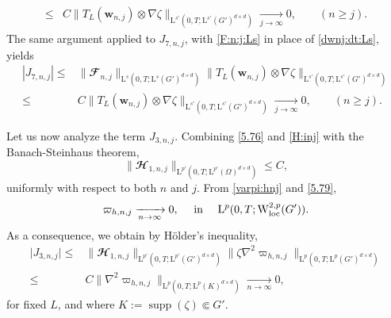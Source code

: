 \documentclass[12pt,reqno]{amsart}
\numberwithin{equation}{section}
\theoremstyle{definition}
\def\1{\Omega}
\def\supp{\operatorname{supp}}
\def\W{\mathrm{W}}
\def\L{\mathrm{L}}
\def\w{\boldsymbol{w}}
\def\bcH{\mathbfcal{H}}
\def\bcF{\mathbfcal{F}}
\begin{document}
{{{\begin{equation}
\begin{split}
\leq &
C\|T_L(\w_{n,j})\otimes\nabla\zeta\|_{\L^{s'}(0,T;\L^{s'}(G')^{d\times d})} \xrightarrow[j\to\infty]{}0,\qquad (n\geq j).
\end{split}
\end{equation}
The same argument applied to $J_{7,n,j}$, with \eqref{F:n:j:Ls} in place of \eqref{dwnj:dt:Ls}, yields
\begin{equation}\label{est:J7:n:j}
\begin{split}
|J_{7,n,j}|\leq & \|\bcF_{n,j}\|_{\L^s(0,T;\L^s(G')^{d\times d})}\|T_L(\w_{n,j})\otimes\nabla\zeta\|_{\L^{s'}(0,T;\L^{s'}(G')^{d\times d})} \\
\leq &
C\|T_L(\w_{n,j})\otimes\nabla\zeta\|_{\L^{s'}(0,T;\L^{s'}(G')^{d\times d})} \xrightarrow[j\to\infty]{}0,\qquad (n\geq j).
\end{split}
\end{equation}

Let us now analyze the term $J_{3,n,j}$.
Combining \eqref{5.76} and \eqref{H:inj} with the Banach-Steinhaus theorem,
\begin{equation*}
\|\bcH_{1,n,j}\|_{\L^{p'}(0,T;\L^{p'}(\1)^{d\times d})} \leq C,
\end{equation*}
uniformly with respect to both $n$ and $j$.
From \eqref{varpi:hnj} and \eqref{5.79},
\begin{equation*}
\varpi_{h,n,j} \xrightarrow[n\to\infty]{} 0,\quad \text{ in }\quad {\L^p(0,T;\W^{2,p}_{\rm{loc}}(G'))}.
\end{equation*}
As a consequence, we obtain by H\"older's inequality,
\begin{equation}\label{est:J3:n:j}
\begin{split}
\big|J_{3,n,j}\big|\leq &
\|\bcH_{1,n,j}\|_{\L^{p'}(0,T;\L^{p'}(G')^{d\times d})}\|\zeta\nabla^2\varpi_{h,n,j}\|_{\L^{p}(0,T;\L^{p}(G')^{d\times d})} \\
\leq &
C\|\nabla^2\varpi_{h,n,j}\|_{\L^{p}(0,T;\L^{p}(K)^{d\times d})}
\xrightarrow[n\to\infty]{} 0,
\end{split}
\end{equation}
for fixed $L$, and where $K:=\supp(\zeta)\Subset G'$.

}}}
\end{document}
